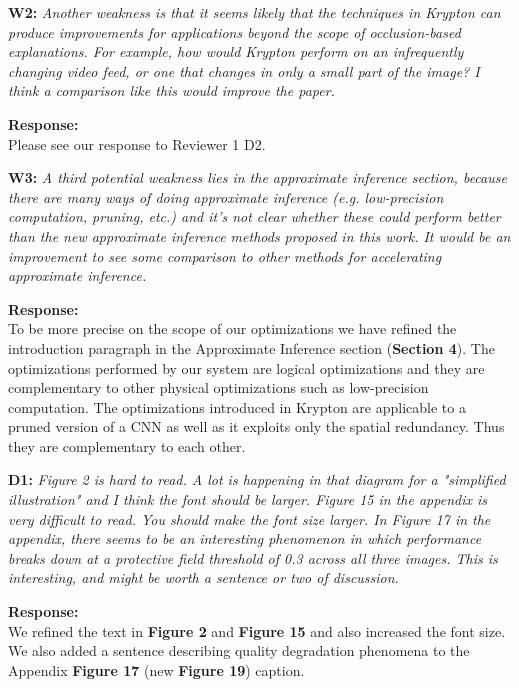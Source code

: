 \documentclass[preprint]{vldb}
\begin{document}
\vspace{2mm}
\noindent \textbf{W2:} \textit{Another weakness is that it seems likely that the techniques in Krypton can produce improvements for applications beyond the scope of occlusion-based explanations. For example, how would Krypton perform on an infrequently changing video feed, or one that changes in only a small part of the image? I think a comparison like this would improve the paper.}

\vspace{2mm}
\noindent \textbf{Response:}\\
Please see our response to Reviewer 1 D2.

\vspace{2mm}
\noindent \textbf{W3:} \textit{A third potential weakness lies in the approximate inference section, because there are many ways of doing approximate inference (e.g. low-precision computation, pruning, etc.) and it's not clear whether these could perform better than the new approximate inference methods proposed in this work. It would be an improvement to see some comparison to other methods for accelerating approximate inference.}

\vspace{2mm}
\noindent \textbf{Response:}\\
To be more precise on the scope of our optimizations we have refined the introduction paragraph in the Approximate Inference section (\textbf{Section 4}).
The optimizations performed by our system are logical optimizations and they are complementary to other physical optimizations such as low-precision computation.
The optimizations introduced in Krypton are applicable to a pruned version of a CNN as well as it exploits only the spatial redundancy. Thus they are complementary to each other.


\vspace{2mm}
\noindent \textbf{D1:} \textit{Figure 2 is hard to read. A lot is happening in that diagram for a "simplified illustration" and I think the font should be larger. Figure 15 in the appendix is very difficult to read. You should make the font size larger. In Figure 17 in the appendix, there seems to be an interesting phenomenon in which performance breaks down at a protective field threshold of 0.3 across all three images. This is interesting, and might be worth a sentence or two of discussion.}


\vspace{2mm}
\noindent \textbf{Response:}\\
We refined the text in \textbf{Figure 2} and \textbf{Figure 15} and also increased the font size.
We also added a sentence describing quality degradation phenomena to the Appendix \textbf{Figure 17} (new \textbf{Figure 19}) caption.
\end{document}
